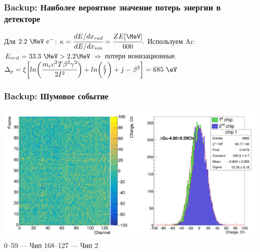 \documentclass[14pt]{beamer}
\begin{document}
\begin{frame}[t]
\frametitle{Backup: Наиболее вероятное значение потерь энергии в детекторе}
Для $2.2~\MeV~e^{-}$:
\newline
\newline $\kappa = \cfrac{dE/dx_{rad}}{dE/dx_{ion}}= \cfrac{ Z E[\MeV] }{600}.$
\newline 
\newline Используем Ar: $E_{crit} = 33.3~\MeV > 2.2 \MeV~\Rightarrow$ потери ионизационные.
\newline
\newline $\Delta_p = \xi\biggl[ln \bigg(\cfrac{ m_ec^2T\beta^2\gamma^2}{2I^2}\bigg) + ln\bigg(\frac{\xi}{I}\bigg) + j - \beta^2 \biggr] = 685~\eV$

\end{frame}



\begin{frame}[c]
\frametitle{Backup: Шумовое событие}
\includegraphics[width=1\linewidth]{Noise_no_filtering.png}
\hspace*{20pt}\tiny{0--59 --- Чип 1}\hspace*{30pt}\tiny{68--127 --- Чип 2}
\end{frame}
\end{document}
